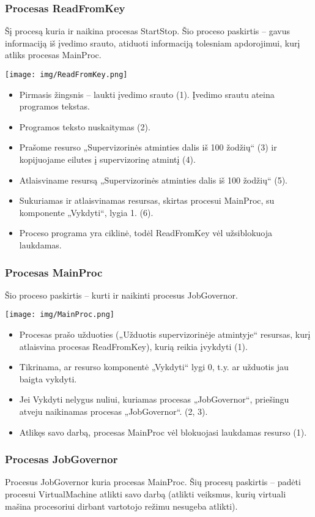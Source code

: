 \subsubsection{Procesas ReadFromKey}
Šį procesą kuria ir naikina procesas StartStop. Šio proceso paskirtis – gavus informaciją iš įvedimo srauto, atiduoti informaciją tolesniam apdorojimui, kurį atliks procesas MainProc.

\texttt{[image: img/ReadFromKey.png]}

	\begin{itemize}
		\item Pirmasis žingsnis – laukti įvedimo srauto (1).  Įvedimo srautu ateina programos tekstas.
		\item Programos teksto nuskaitymas (2).
		\item Prašome resurso „Supervizorinės atminties dalis iš 100 žodžių“ (3) ir kopijuojame eilutes į supervizorinę atmintį (4).
		\item Atlaisviname resursą „Supervizorinės atminties dalis iš 100 žodžių“ (5).
		\item Sukuriamas ir atlaisvinamas resursas, skirtas procesui MainProc, su komponente „Vykdyti“, lygia 1. (6). 
		\item Proceso programa yra ciklinė, todėl ReadFromKey vėl užsiblokuoja laukdamas.
	\end{itemize}
\subsubsection{Procesas MainProc}
Šio proceso paskirtis – kurti ir naikinti procesus JobGovernor.

\texttt{[image: img/MainProc.png]}

	\begin{itemize}
		\item Procesas prašo užduoties („Užduotis supervizorinėje atmintyje“ resursas, kurį atlaisvina procesas ReadFromKey), kurią reikia įvykdyti (1).
		\item Tikrinama, ar resurso komponentė „Vykdyti“ lygi 0, t.y. ar užduotis jau baigta vykdyti.
		\item Jei Vykdyti nelygus nuliui, kuriamas procesas „JobGovernor“, priešingu atveju naikinamas procesas „JobGovernor“. (2, 3).
		\item Atlikęs savo darbą, procesas MainProc vėl blokuojasi laukdamas resurso (1).
	\end{itemize}
\subsubsection{Procesas JobGovernor}
Procesus JobGovernor kuria procesas MainProc. Šių procesų paskirtis – padėti procesui VirtualMachine atlikti savo darbą (atlikti veiksmus, kurių virtuali mašina procesoriui dirbant vartotojo režimu nesugeba atlikti).

